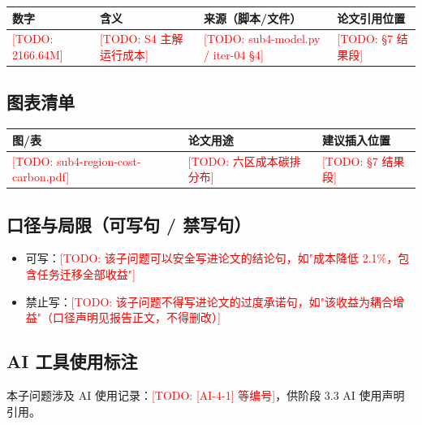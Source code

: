 \documentclass{article}   %
\newcommand{\todo}[1]{\textcolor{red}{[TODO: #1]}}
\begin{document}
\begin{center}
\footnotesize
\begin{tabular}{llll}
\toprule
数字 & 含义 & 来源（脚本/文件） & 论文引用位置 \\
\midrule
\todo{2166.64M} & \todo{S4 主解运行成本} & \todo{sub4-model.py / iter-04 §4} & \todo{§7 结果段} \\
\bottomrule
\end{tabular}
\end{center}

\subsection{图表清单}

\begin{center}
\footnotesize
\begin{tabular}{lll}
\toprule
图/表 & 论文用途 & 建议插入位置 \\
\midrule
\todo{sub4-region-cost-carbon.pdf} & \todo{六区成本碳排分布} & \todo{§7 结果段} \\
\bottomrule
\end{tabular}
\end{center}

\subsection{口径与局限（可写句 / 禁写句）}

\begin{itemize}
  \item 可写：\todo{该子问题可以安全写进论文的结论句，如"成本降低 2.1\%，包含任务迁移全部收益"} 
  \item 禁止写：\todo{该子问题不得写进论文的过度承诺句，如"该收益为耦合增益"（口径声明见报告正文，不得删改）}
\end{itemize}

\subsection{AI 工具使用标注}

本子问题涉及 AI 使用记录：\todo{[AI-4-1] 等编号}，供阶段 3.3 AI 使用声明引用。
\end{document}
